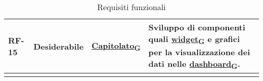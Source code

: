 \begin{longtable}{|>{\centering\arraybackslash}m{}|>{\centering\arraybackslash}m{}|>{\centering\arraybackslash}m{}|>{\centering\arraybackslash}m{}|}
	RF-15           & Desiderabile        & \href{https://7last.github.io/docs/rtb/documentazione-interna/glossario\#capitolato}{Capitolato\textsubscript{G}}     & Sviluppo di componenti quali \href{https://7last.github.io/docs/rtb/documentazione-interna/glossario\#widget}{widget\textsubscript{G}} e grafici per la visualizzazione dei dati nelle \href{https://7last.github.io/docs/rtb/documentazione-interna/glossario\#dashboard}{dashboard\textsubscript{G}}.                                                                                                                                                                                                                     \\\hline

	\caption{Requisiti funzionali}
	\label{table:1}
\end{longtable}

